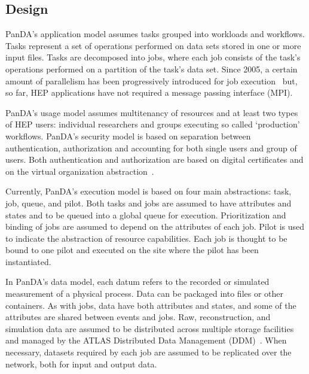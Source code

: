 \documentclass[conference]{IEEEtran}
\begin{document}
\subsection{Design}
\label{ssec:panda_design}

PanDA's application model assumes tasks grouped into workloads and workflows.
Tasks represent a set of operations performed on data sets stored in one or more
input files. Tasks are decomposed into jobs, where each job consists of the
task's operations performed on a partition of the task's data set. Since 2005, a
certain amount of parallelism has been progressively introduced for job
execution~\cite{crooks2012multi} but, so far, HEP applications have not required
a message passing interface (MPI).

PanDA's usage model assumes multitenancy of resources and at least two types of
HEP users: individual researchers and groups executing so called `production'
workflows.
PanDA's security model is based on separation between authentication,
authorization and accounting for both single users and group of users. Both
authentication and authorization are based on digital certificates and on the
virtual organization abstraction~\cite{foster2001anatomy}.

Currently, PanDA's execution model is based on four main abstractions: task,
job, queue, and pilot. Both tasks and jobs are assumed to have attributes and
states and to be queued into a global queue for execution. Prioritization and
binding of jobs are assumed to depend on the attributes of each job. Pilot is
used to indicate the abstraction of resource capabilities. Each job is thought
to be bound to one pilot and executed on the site where the pilot has been
instantiated.

In PanDA's data model, each datum refers to the recorded or simulated
measurement of a physical process. Data can be packaged into files or other
containers. As with jobs, data have both attributes and states, and some of the
attributes are shared between events and jobs. Raw, reconstruction, and
simulation data are assumed to be distributed across multiple storage facilities
and managed by the ATLAS Distributed Data Management
(DDM)~\cite{garonne2012atlas}. When necessary, datasets required by each job are
assumed to be replicated over the network, both for input and output data.
\end{document}
